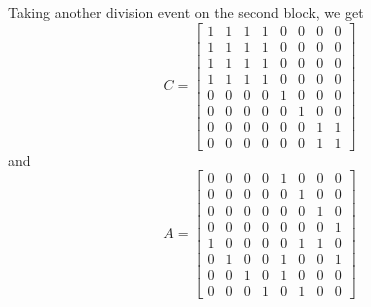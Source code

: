 Taking another division event on the second block, we get
\begin{equation*}
    C = 
    \begin{bmatrix}
    1 & 1 & 1 & 1 & 0 & 0 & 0 & 0 \\
    1 & 1 & 1 & 1 & 0 & 0 & 0 & 0 \\
    1 & 1 & 1 & 1 & 0 & 0 & 0 & 0 \\
    1 & 1 & 1 & 1 & 0 & 0 & 0 & 0 \\
    0 & 0 & 0 & 0 & 1 & 0 & 0 & 0 \\
    0 & 0 & 0 & 0 & 0 & 1 & 0 & 0 \\
    0 & 0 & 0 & 0 & 0 & 0 & 1 & 1 \\
    0 & 0 & 0 & 0 & 0 & 0 & 1 & 1 
    \end{bmatrix}
\end{equation*}
and 
\begin{equation*}
    A = 
    \begin{bmatrix}
    0 & 0 & 0 & 0 & 1 & 0 & 0 & 0 \\
    0 & 0 & 0 & 0 & 0 & 1 & 0 & 0 \\
    0 & 0 & 0 & 0 & 0 & 0 & 1 & 0 \\
    0 & 0 & 0 & 0 & 0 & 0 & 0 & 1 \\
    1 & 0 & 0 & 0 & 0 & 1 & 1 & 0 \\
    0 & 1 & 0 & 0 & 1 & 0 & 0 & 1 \\
    0 & 0 & 1 & 0 & 1 & 0 & 0 & 0 \\
    0 & 0 & 0 & 1 & 0 & 1 & 0 & 0 
    \end{bmatrix}
\end{equation*}



